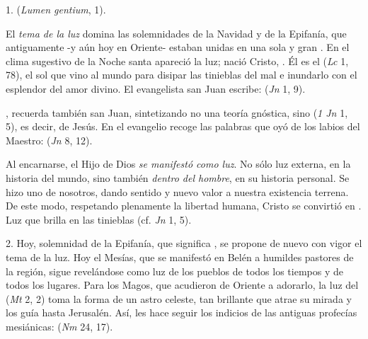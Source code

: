 				\begin{body}
					1.  (\emph{Lumen gentium}, 1).
					
					El \emph{tema de la luz} domina las solemnidades de la Navidad y de la Epifanía, que antiguamente -y aún hoy en Oriente- estaban unidas en una sola y gran . En el clima sugestivo de la Noche santa apareció la luz; nació Cristo, . Él es el  (\emph{Lc} 1, 78), el sol que vino al mundo para disipar las tinieblas del mal e inundarlo con el esplendor del amor divino. El evangelista san Juan escribe:  (\emph{Jn} 1, 9).
					
					, recuerda también san Juan, sintetizando no una teoría gnóstica, sino  (\emph{1 Jn} 1, 5), es decir, de Jesús. En el evangelio recoge las palabras que oyó de los labios del Maestro:  (\emph{Jn} 8, 12).
					
					Al encarnarse, el Hijo de Dios \emph{se manifestó como luz}. No sólo luz externa, en la historia del mundo, sino también \emph{dentro del hombre}, en su historia personal. Se hizo uno de nosotros, dando sentido y nuevo valor a nuestra existencia terrena. De este modo, respetando plenamente la libertad humana, Cristo se convirtió en . Luz que brilla en las tinieblas (cf. \emph{Jn} 1, 5).
					
					2. Hoy, solemnidad de la Epifanía, que significa , se propone de nuevo con vigor el tema de la luz. Hoy el Mesías, que se manifestó en Belén a humildes pastores de la región, sigue revelándose como luz de los pueblos de todos los tiempos y de todos los lugares. Para los Magos, que acudieron de Oriente a adorarlo, la luz del  (\emph{Mt} 2, 2) toma la forma de un astro celeste, tan brillante que atrae su mirada y los guía hasta Jerusalén. Así, les hace seguir los indicios de las antiguas profecías mesiánicas:  (\emph{Nm} 24, 17).
					

\end{body}
